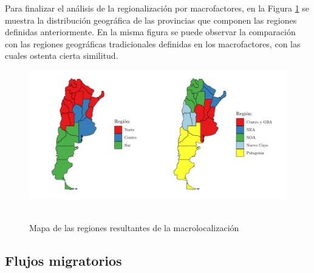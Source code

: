 \documentclass[12pt,a4paper]{article}
\begin{document}
Para finalizar el análisis de la regionalización por macrofactores, en la Figura \ref{figure:mapa_reg} se muestra la distribución geográfica de las provincias que componen las regiones definidas anteriormente. En la misma figura se puede observar la comparación con las regiones geográficas tradicionales definidas en los macrofactores, con las cuales ostenta cierta similitud.
\begin{figure}[ht!]
\begin{center}
\caption{\\Mapa de las regiones resultantes de la macrolocalización}
\includegraphics[scale=0.7]{./graficos/mapa_regiones.pdf}
\label{figure:mapa_reg}
\end{center}
\end{figure}

\subsection{Flujos migratorios}
\end{document}
